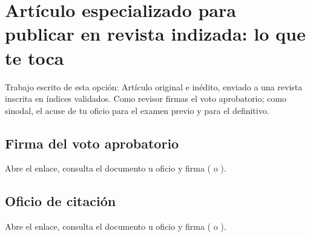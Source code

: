 \section{Artículo especializado para publicar en revista indizada: lo que te toca}
Trabajo escrito de esta opción: Artículo original e inédito, enviado a una revista inscrita en índices validados. Como revisor firmas el voto aprobatorio; como sinodal, el acuse de tu oficio para el examen previo y para el definitivo.
\subsection{Firma del voto aprobatorio}
Abre el enlace, consulta el documento u oficio y firma ( o ).
\subsection{Oficio de citación}
Abre el enlace, consulta el documento u oficio y firma ( o ).

